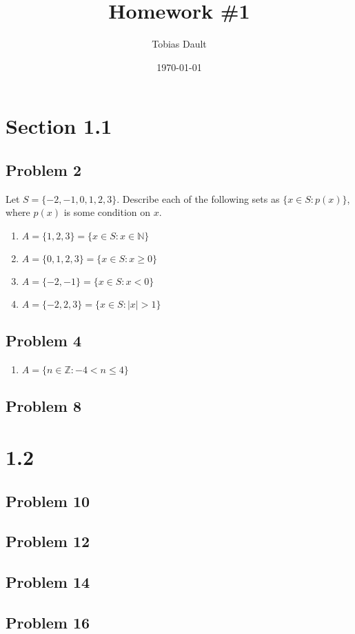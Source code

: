 \documentclass{article}
\title{Homework \#1}
\author{Tobias Dault}
\date{\today}
\begin{document}
	\maketitle 
	
	\section*{Section 1.1}
	\subsection*{Problem 2}
	Let $S=\{-2,-1,0,1,2,3\}$. Describe each of the following sets as $\{x\in S : p(x)\}$, where $p(x)$ is some condition on $x$.
	\begin{enumerate}[label=(\alph*)]
		\item $A=\{1,2,3\}=\{x\in S: x\in\mathbb{N}\}$
		\item $A=\{0,1,2,3\}=\{x\in S: x\geq0\}$
		\item $A=\{-2,-1\}=\{x\in S: x<0\}$
		\item $A=\{-2,2,3\}=\{x\in S: |x|>1\}$
	\end{enumerate}
	\subsection*{Problem 4}
	\begin{enumerate}[label=(\alph*)]
		\item $A=\{n\in\mathbb{Z}:-4<n\leq4\}$
	\end{enumerate}
	\subsection*{Problem 8}
	
	\section{1.2}
	\subsection*{Problem 10}
	\subsection*{Problem 12}
	\subsection*{Problem 14}
	\subsection*{Problem 16}
\end{document}
